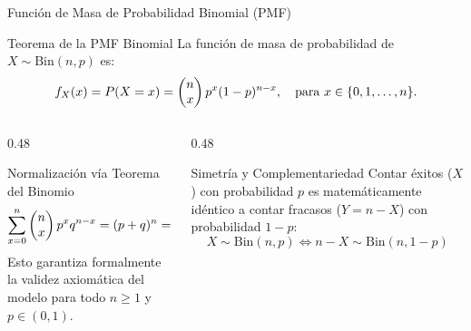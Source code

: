 \documentclass[10pt, aspectratio=169]{beamer}
\begin{document}
\begin{frame}{Función de Masa de Probabilidad Binomial (PMF)}
  \begin{block}{Teorema de la PMF Binomial}
    \footnotesize
    La función de masa de probabilidad de $X \sim \text{Bin}(n, p)$ es:
    $$f_X(x) = P(X = x) = \begin{pmatrix} n \\ x \end{pmatrix} p^x (1-p)^{n-x}, \quad \text{para } x \in \{0, 1, \dots, n\}.$$
  \end{block}
  \vspace{-0.05cm}
  \pause
  \begin{columns}[T]
    \begin{column}{0.48\textwidth}
      \begin{exampleblock}{Normalización vía Teorema del Binomio}
        \footnotesize
        $$\sum_{x=0}^n \begin{pmatrix} n \\ x \end{pmatrix} p^x q^{n-x} = (p + q)^n = 1^n = 1$$
        Esto garantiza formalmente la validez axiomática del modelo para todo $n \ge 1$ y $p \in (0, 1)$.
      \end{exampleblock}
    \end{column}
    \begin{column}{0.48\textwidth}
      \begin{alertblock}{Simetría y Complementariedad}
        \footnotesize
        Contar éxitos ($X$) con probabilidad $p$ es matemáticamente idéntico a contar fracasos ($Y = n - X$) con probabilidad $1-p$:
        $$X \sim \text{Bin}(n, p) \iff n-X \sim \text{Bin}(n, 1-p)$$
      \end{alertblock}
    \end{column}
  \end{columns}
\end{frame}
\end{document}
